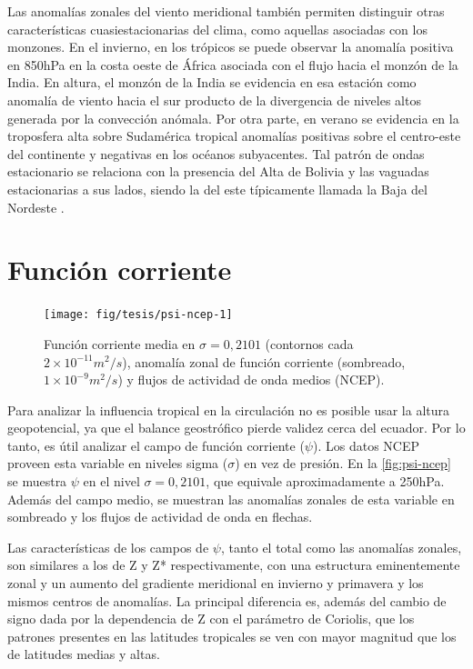 \documentclass[spanish,a4paper,12pt,oneside]{book}
\begin{document}
Las anomalías zonales del viento meridional también permiten distinguir
otras características cuasiestacionarias del clima, como aquellas
asociadas con los monzones. En el invierno, en los trópicos se puede
observar la anomalía positiva en 850hPa en la costa oeste de África
asociada con el flujo hacia el monzón de la India. En altura, el monzón
de la India se evidencia en esa estación como anomalía de viento hacia
el sur producto de la divergencia de niveles altos generada por la
convección anómala. Por otra parte, en verano se evidencia en la
troposfera alta sobre Sudamérica tropical anomalías positivas sobre el
centro-este del continente y negativas en los océanos subyacentes. Tal
patrón de ondas estacionario se relaciona con la presencia del Alta de
Bolivia y las vaguadas estacionarias a sus lados, siendo la del este
típicamente llamada la Baja del Nordeste \citep{Vera2006}.

\section{Función corriente}\label{funcion-corriente}

\begin{landscape}\begin{figure}

{\centering \texttt{[image: fig/tesis/psi-ncep-1]} 

}

\caption{Función corriente media en $\sigma = 0,2101$ (contornos cada $2\times10^{-11}m^2/s$), anomalía zonal de función corriente (sombreado,  $1\times10^{-9}m^2/s$) y flujos de actividad de onda medios (NCEP).}\label{fig:psi-ncep}
\end{figure}
\end{landscape}

Para analizar la influencia tropical en la circulación no es posible
usar la altura geopotencial, ya que el balance geostrófico pierde
validez cerca del ecuador. Por lo tanto, es útil analizar el campo de
función corriente (\(\psi\)). Los datos NCEP proveen esta variable en
niveles sigma (\(\sigma\)) en vez de presión. En la
\autoref{fig:psi-ncep} se muestra \(\psi\) en el nivel
\(\sigma = 0,2101\), que equivale aproximadamente a 250hPa. Además del
campo medio, se muestran las anomalías zonales de esta variable en
sombreado y los flujos de actividad de onda en flechas.

Las características de los campos de \(\psi\), tanto el total como las
anomalías zonales, son similares a los de Z y Z* respectivamente, con
una estructura eminentemente zonal y un aumento del gradiente meridional
en invierno y primavera y los mismos centros de anomalías. La principal
diferencia es, además del cambio de signo dada por la dependencia de Z
con el parámetro de Coriolis, que los patrones presentes en las
latitudes tropicales se ven con mayor magnitud que los de latitudes
medias y altas.
\end{document}
